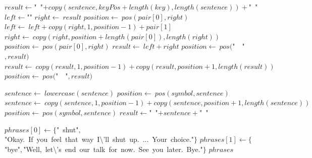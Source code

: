 \documentclass[a4paper,10pt]{article}
\begin{document}
\begin{algorithm}
\caption{conjugateStrings(sentence, key, keyPos, flexions)}
\begin{algorithmic}[5]

  \STATE \(result\gets\)"{}\ "{}\(+copy(sentence,keyPos+length(key),length(sentence))+\)"{}\ "{}\(\)
    \STATE \(left\gets\)"{}"{}\(\)
    \STATE \(right\gets\ result\)
    \STATE \(position\gets\ pos(pair[0],right)\)
      \STATE \(left\gets\ left+copy(right,1,position-1)+pair[1]\)
      \STATE \(right\gets\ copy(right,position+length(pair[0]),length(right))\)
      \STATE \(position\gets\ pos(pair[0],right)\)
    \ENDWHILE
    \STATE \(result\gets\ left+right\)
  \ENDFOR
  \STATE \(position\gets\ pos(\)"{}\ \ "{}\(,result)\)
    \STATE \(result\gets\ copy(result,1,position-1)+copy(result,position+1,length(result))\)
    \STATE \(position\gets\ pos(\)"{}\ \ "{}\(,result)\)
  \ENDWHILE

\end{algorithmic}
\end{algorithm}


\begin{algorithm}
\caption{normalizeInput(sentence)}
\begin{algorithmic}[5]

\STATE {}
\STATE {}
\STATE {}
  \STATE \(sentence\gets\ lowercase(sentence)\)
    \STATE \(position\gets\ pos(symbol,sentence)\)
      \STATE \(sentence\gets\ copy(sentence,1,position-1)+copy(sentence,position+1,length(sentence))\)
      \STATE \(position\gets\ pos(symbol,sentence)\)
    \ENDWHILE
  \ENDFOR
  \STATE \(result\gets\)"{}\ "{}\(+sentence+\)"{}\ "{}\(\)

\end{algorithmic}
\end{algorithm}


\begin{algorithm}
\caption{setupGoodByePhrases()}
\begin{algorithmic}[5]

  \STATE \(phrases[0]\gets\{\)"{}\ shut"{}\(,\)"{}Okay.\ If\ you\ feel\ that\ way\ I\textbackslash{}'{}ll\ shut\ up.\ ...\ Your\ choice."{}\(\}\)
  \STATE \(phrases[1]\gets\{\)"{}bye"{}\(,\)"{}Well,\ let\textbackslash{}'{}s\ end\ our\ talk\ for\ now.\ See\ you\ later.\ Bye."{}\(\}\)
  \RETURN\(phrases\)

\end{algorithmic}
\end{algorithm}
\end{document}
